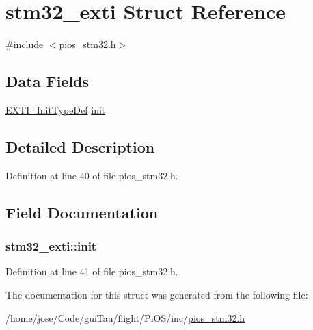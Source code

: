 \hypertarget{structstm32__exti}{\section{stm32\-\_\-exti Struct Reference}
\label{structstm32__exti}
}


{\ttfamily \#include $<$pios\-\_\-stm32.\-h$>$}

\subsection*{Data Fields}
\begin{DoxyCompactItemize}
\item 
\hyperlink{struct_e_x_t_i___init_type_def}{E\-X\-T\-I\-\_\-\-Init\-Type\-Def} \hyperlink{structstm32__exti_a87f2c25add68d3308e34a4a5b8facd30}{init}
\end{DoxyCompactItemize}


\subsection{Detailed Description}


Definition at line 40 of file pios\-\_\-stm32.\-h.



\subsection{Field Documentation}
\hypertarget{structstm32__exti_a87f2c25add68d3308e34a4a5b8facd30}{
\subsubsection[{init}]{ stm32\-\_\-exti\-::init}}\label{structstm32__exti_a87f2c25add68d3308e34a4a5b8facd30}


Definition at line 41 of file pios\-\_\-stm32.\-h.



The documentation for this struct was generated from the following file\-:\begin{DoxyCompactItemize}
\item 
/home/jose/\-Code/gui\-Tau/flight/\-Pi\-O\-S/inc/\hyperlink{pios__stm32_8h}{pios\-\_\-stm32.\-h}\end{DoxyCompactItemize}

